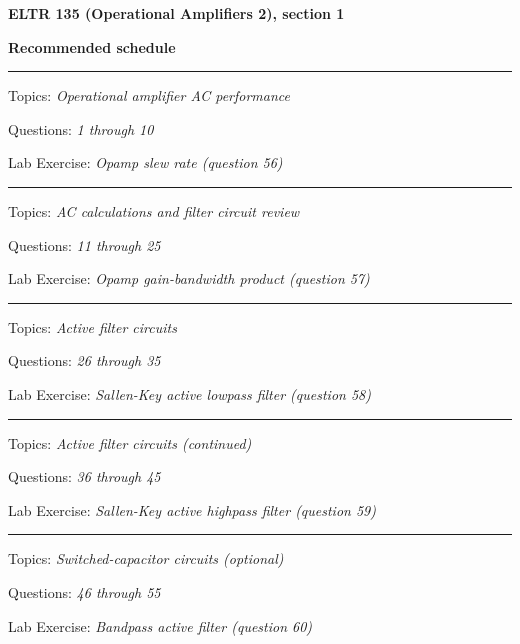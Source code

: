 
\centerline{\bf ELTR 135 (Operational Amplifiers 2), section 1} \bigskip 
 
\vskip 10pt

\noindent
{\bf Recommended schedule}

\vskip 5pt

\hrule \vskip 5pt
\noindent
{}

\hskip 10pt Topics: {\it Operational amplifier AC performance}
 
\hskip 10pt Questions: {\it 1 through 10}
 
\hskip 10pt Lab Exercise: {\it Opamp slew rate (question 56)}
 


\vskip 10pt
\hrule \vskip 5pt
\noindent
{}

\hskip 10pt Topics: {\it AC calculations and filter circuit review}
 
\hskip 10pt Questions: {\it 11 through 25}
 
\hskip 10pt Lab Exercise: {\it Opamp gain-bandwidth product (question 57)}
 
\vskip 10pt
\hrule \vskip 5pt
\noindent
{}

\hskip 10pt Topics: {\it Active filter circuits}
 
\hskip 10pt Questions: {\it 26 through 35}
 
\hskip 10pt Lab Exercise: {\it Sallen-Key active lowpass filter (question 58)}
 
\vskip 10pt
\hrule \vskip 5pt
\noindent
{}

\hskip 10pt Topics: {\it Active filter circuits (continued)}
 
\hskip 10pt Questions: {\it 36 through 45}
 
\hskip 10pt Lab Exercise: {\it Sallen-Key active highpass filter (question 59)}
 
\vskip 10pt
\hrule \vskip 5pt
\noindent
{}

\hskip 10pt Topics: {\it Switched-capacitor circuits (optional)}
 
\hskip 10pt Questions: {\it 46 through 55}
 
\hskip 10pt Lab Exercise: {\it Bandpass active filter (question 60)}
 

